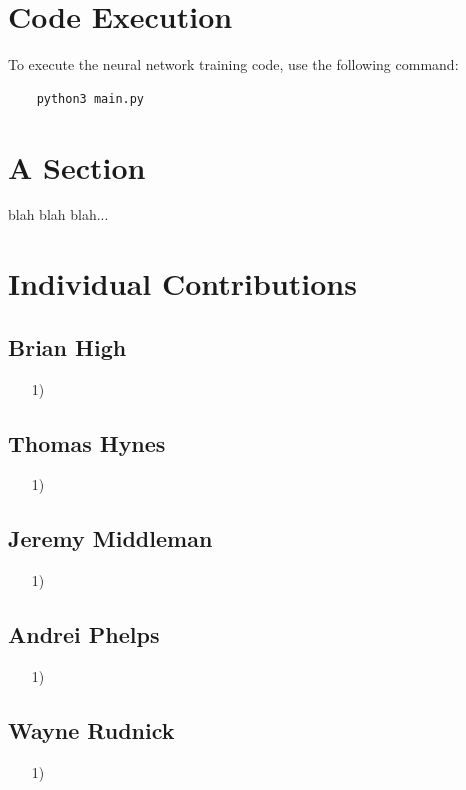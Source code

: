 \documentclass{article}
\begin{document}
\newpage

\section{Code Execution}

To execute the neural network training code, use the following command:
\begin{verbatim}
    python3 main.py
\end{verbatim}

\section{A Section}
blah blah blah...

\section{Individual Contributions}

\subsection{Brian High}
\begin{itemize}
    \item[1)] 
\end{itemize}

\subsection{Thomas Hynes}
\begin{itemize}
    \item[1)] 
\end{itemize}

\subsection{Jeremy Middleman}
\begin{itemize}
    \item[1)] 
\end{itemize}

\subsection{Andrei Phelps}
\begin{itemize}
    \item[1)] 
\end{itemize}

\subsection{Wayne Rudnick}
\begin{itemize}
    \item[1)] 
\end{itemize}
\end{document}
